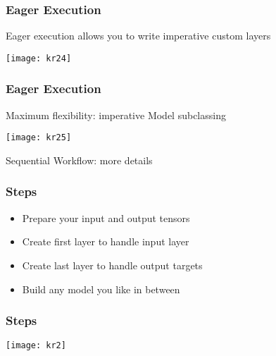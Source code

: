 \begin{frame}[fragile] \frametitle{Eager Execution}

Eager execution allows you to write imperative custom layers


\begin{center}
\texttt{[image: kr24]}
\end{center}
\end{frame}

\begin{frame}[fragile] \frametitle{Eager Execution}

Maximum flexibility: imperative Model subclassing

\begin{center}
\texttt{[image: kr25]}
\end{center}
\end{frame}



\begin{frame}
  \begin{center}
    {\Large Sequential Workflow: more details}
    
  \end{center}
\end{frame}
\begin{frame}[fragile] \frametitle{Steps}

\begin{itemize}
\item  Prepare your 
input and 
output tensors 
\item  Create first 
layer to handle 
input layer
\item  Create last 
layer to handle 
output targets
\item Build any 
model you like 
in between
\end{itemize}
\end{frame}

\begin{frame}[fragile] \frametitle{Steps}
\begin{center}
\texttt{[image: kr2]}
\end{center}
\end{frame}

